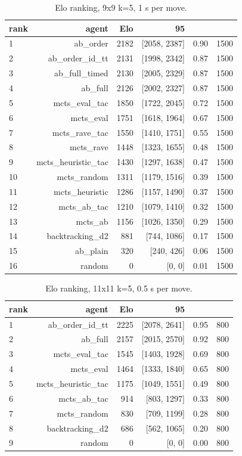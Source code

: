 \begin{table}[ht]
\centering
\begin{tabular}{lrrrrr}
\toprule
rank & agent & Elo & 95\\%
\midrule
1 & ab\_order & 2182 & [2058, 2387] & 0.90 & 1500 \\
2 & ab\_order\_id\_tt & 2131 & [1998, 2342] & 0.87 & 1500 \\
3 & ab\_full\_timed & 2130 & [2005, 2329] & 0.87 & 1500 \\
4 & ab\_full & 2126 & [2002, 2327] & 0.87 & 1500 \\
5 & mcts\_eval\_tac & 1850 & [1722, 2045] & 0.72 & 1500 \\
6 & mcts\_eval & 1751 & [1618, 1964] & 0.67 & 1500 \\
7 & mcts\_rave\_tac & 1550 & [1410, 1751] & 0.55 & 1500 \\
8 & mcts\_rave & 1448 & [1323, 1655] & 0.48 & 1500 \\
9 & mcts\_heuristic\_tac & 1430 & [1297, 1638] & 0.47 & 1500 \\
10 & mcts\_random & 1311 & [1179, 1516] & 0.39 & 1500 \\
11 & mcts\_heuristic & 1286 & [1157, 1490] & 0.37 & 1500 \\
12 & mcts\_ab\_tac & 1210 & [1079, 1410] & 0.32 & 1500 \\
13 & mcts\_ab & 1156 & [1026, 1350] & 0.29 & 1500 \\
14 & backtracking\_d2 & 881 & [744, 1086] & 0.17 & 1500 \\
15 & ab\_plain & 320 & [240, 426] & 0.06 & 1500 \\
16 & random & 0 & [0, 0] & 0.01 & 1500 \\
\bottomrule
\end{tabular}
\caption{Elo ranking, 9x9 k=5, 1 s per move.}
\label{tab:elo-9x5}
\end{table}

\begin{table}[ht]
\centering
\begin{tabular}{lrrrrr}
\toprule
rank & agent & Elo & 95\\%
\midrule
1 & ab\_order\_id\_tt & 2225 & [2078, 2641] & 0.95 & 800 \\
2 & ab\_full & 2157 & [2015, 2570] & 0.92 & 800 \\
3 & mcts\_eval\_tac & 1545 & [1403, 1928] & 0.69 & 800 \\
4 & mcts\_eval & 1464 & [1333, 1840] & 0.65 & 800 \\
5 & mcts\_heuristic\_tac & 1175 & [1049, 1551] & 0.49 & 800 \\
6 & mcts\_ab\_tac & 914 & [803, 1297] & 0.33 & 800 \\
7 & mcts\_random & 830 & [709, 1199] & 0.28 & 800 \\
8 & backtracking\_d2 & 686 & [562, 1065] & 0.20 & 800 \\
9 & random & 0 & [0, 0] & 0.00 & 800 \\
\bottomrule
\end{tabular}
\caption{Elo ranking, 11x11 k=5, 0.5 s per move.}
\label{tab:elo-11x5}
\end{table}
